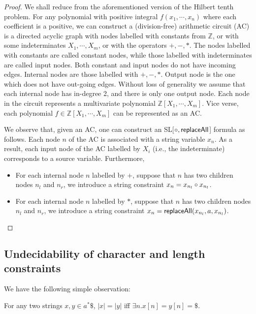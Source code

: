 \begin{proof}
	We shall reduce from the aforementioned version of the Hilbert tenth problem. For any polynomial with positive integral  $f(x_1, \cdots, x_n)$ where each coefficient is a positive, we can construct a (division-free) arithmetic circuit (AC) is a directed  acyclic graph with nodes labelled with constants from $\mathbb{Z}$, or with some indeterminates $X_1, \cdots, X_m$, or with the operators $+, -, *$. The nodes labelled with constants are called constant nodes, while those labelled with indeterminates are called input nodes. Both constant and input nodes do not have incoming edges. Internal nodes are those labelled with $+,-,*$. Output node is the one which does not have out-going edges. Without loss of generality we assume that each internal node has in-degree 2, and there is only one output node. Each node in the circuit represents a multivariate polynomial $\mathbb{Z}[X_1, \cdots, X_m]$. Vice verse, each polynomial $f\in \mathbb{Z}[X_1, \cdots, X_m]$ can be represented as an AC. 
	
	We observe that, given an AC, one can construct an SL[$\circ, \mathsf{replaceAll}$] formula as follows. Each node $n$ of the AC is associated with a string variable $x_n$. As a result, each input node of the AC labelled by $X_i$ (i.e., the indeterminate) corresponds to a  source variable. Furthermore,  
	\begin{itemize}
		\item For each internal node $n$ labelled by $+$, suppose that $n$ has two children nodes $n_l$ and $n_r$, we introduce a string constraint $x_n= x_{n_l}\circ x_{n_l}$.  
		
		\item For each internal node $n$ labelled by $*$, suppose that $n$ has two children nodes $n_l$ and $n_r$, we introduce a string constraint $x_n= \mathsf{replaceAll}(x_{n_l}, a, x_{n_l})$.  
		
	\end{itemize}
  \end{proof}

\subsection{Undecidability of character and length constraints}



We have the following simple observation:

\begin{lemma}
	For any two strings $x,y\in a^*\$$, $|x|=|y|$ iff $\exists n. x[n]=y[n]=\$$. 
\end{lemma}

